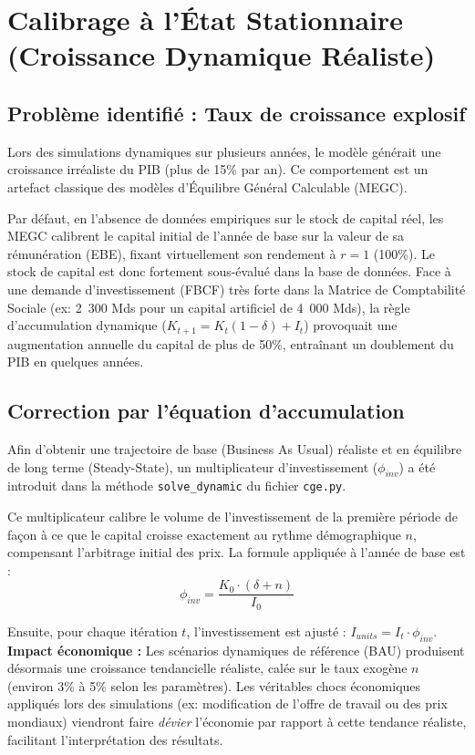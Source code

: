 \documentclass[11pt,a4paper]{article}
\begin{document}
\section{Calibrage à l'État Stationnaire (Croissance Dynamique Réaliste)}

\subsection{Problème identifié : Taux de croissance explosif}
Lors des simulations dynamiques sur plusieurs années, le modèle générait une croissance irréaliste du PIB (plus de 15\% par an). Ce comportement est un artefact classique des modèles d'Équilibre Général Calculable (MEGC). 

Par défaut, en l'absence de données empiriques sur le stock de capital réel, les MEGC calibrent le capital initial de l'année de base sur la valeur de sa rémunération (EBE), fixant virtuellement son rendement à $r=1$ (100\%). Le stock de capital est donc fortement sous-évalué dans la base de données.
Face à une demande d'investissement (FBCF) très forte dans la Matrice de Comptabilité Sociale (ex: 2~300 Mds pour un capital artificiel de 4~000 Mds), la règle d'accumulation dynamique ($K_{t+1} = K_t(1-\delta) + I_t$) provoquait une augmentation annuelle du capital de plus de 50\%, entraînant un doublement du PIB en quelques années.

\subsection{Correction par l'équation d'accumulation}
Afin d'obtenir une trajectoire de base (Business As Usual) réaliste et en équilibre de long terme (Steady-State), un multiplicateur d'investissement ($\phi_{inv}$) a été introduit dans la méthode \texttt{solve\_dynamic} du fichier \texttt{cge.py}. 

Ce multiplicateur calibre le volume de l'investissement de la première période de façon à ce que le capital croisse exactement au rythme démographique $n$, compensant l'arbitrage initial des prix. La formule appliquée à l'année de base est :
\begin{equation}
    \phi_{inv} = \frac{K_0 \cdot (\delta + n)}{I_0}
\end{equation}

Ensuite, pour chaque itération $t$, l'investissement est ajusté : $I_{units} = I_t \cdot \phi_{inv}$.
\textbf{Impact économique :} Les scénarios dynamiques de référence (BAU) produisent désormais une croissance tendancielle réaliste, calée sur le taux exogène $n$ (environ 3\% à 5\% selon les paramètres). Les véritables chocs économiques appliqués lors des simulations (ex: modification de l'offre de travail ou des prix mondiaux) viendront faire \textit{dévier} l'économie par rapport à cette tendance réaliste, facilitant l'interprétation des résultats.
\end{document}
